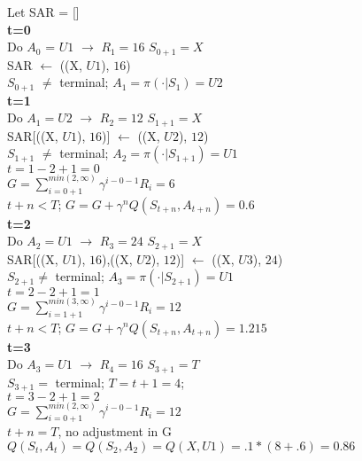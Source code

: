 \documentclass{article}
\begin{document}
\begin{algorithm}
    Let SAR = [] \\
    \textbf{t=0} \\
    Do $A_0$ = $U1$ $\rightarrow$ $R_{1} = 16$ $S_{0+1} = X$  \\
    SAR $\leftarrow$ ((X, $U1$), $16$) \\
    $S_{0+1}$ $\neq$ terminal; $A_1=\pi(\cdot|S_1)=U2$\\
    \textbf{t=1}\\
    Do $A_1=U2$ $\rightarrow$ $R_2=12$ $S_{1+1}=X$ \\
    SAR[((X, $U1$), $16$)] $\leftarrow$ ((X, $U2$), $12$) \\
    $S_{1+1}$ $\neq$ terminal; $A_{2} = \pi(\cdot | S_{1+1}) =U1$ \\
    $t = 1 - 2 + 1 = 0$ \\
    $G = \sum^{min(2, \infty)}_{i=0+1} \gamma^{i-0-1} R_i = 6$ \\
    $t + n < T$; $G = G + \gamma^n Q(S_{t+n}, A_{t+n}) = 0.6$\\
    \textbf{t=2} \\
    Do $A_2=U1$ $\rightarrow$ $R_3=24$ $S_{2+1} = X$ \\
    SAR[((X, $U1$), $16$),((X, $U2$), $12$)] $\leftarrow$ ((X, $U3$), $24$) \\
    $S_{2+1} \neq$ terminal; $A_3=\pi(\cdot | S_{2+1}) = U1$ \\
    $t = 2- 2 + 1 = 1$\\
    $G = \sum^{min(3, \infty)}_{i=1+1} \gamma^{i-0-1} R_i = 12$ \\
    $t + n < T$;  $G = G + \gamma^n Q(S_{t+n}, A_{t+n}) = 1.215$\\
    \textbf{t=3}\\
    Do $A_3=U1$ $\rightarrow$ $R_4=16$ $S_{3+1} = T$ \\
    $S_{3+1} =$ terminal; $T = t+1 = 4$;\\
    $t = 3 - 2 + 1 = 2$ \\
    $G = \sum^{min(2, \infty)}_{i=0+1} \gamma^{i-0-1} R_i = 12$ \\
    $t + n = T$, no adjustment in G\\
    $Q(S_t, A_t)=Q(S_2, A_2)=Q(X, U1)=.1* ( 8+.6) =  0.86$
\end{algorithm}

\begin{algorithm}

\end{algorithm}
\end{document}
